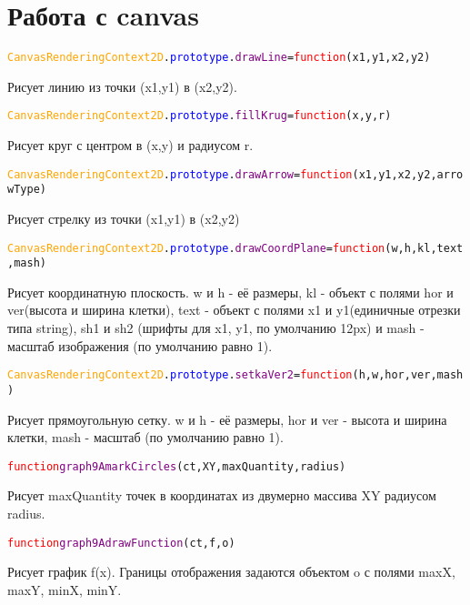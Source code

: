 \documentclass[a4paper,12pt]{article}
\begin{document}
	\section{Работа с canvas}
	\begin{alltt}
		\textcolor{Orange}{CanvasRenderingContext2D}.\textcolor{Blue}{prototype}.\textcolor{Purple}{drawLine}=\textcolor{Red}{function}(x1,y1,x2,y2)
	\end{alltt}
	Рисует линию из точки (x1,y1) в (x2,y2).
	\begin{alltt}
		\textcolor{Orange}{CanvasRenderingContext2D}.\textcolor{Blue}{prototype}.\textcolor{Purple}{fillKrug}=\textcolor{Red}{function}(x,y,r)
	\end{alltt}
	Рисует круг с центром в (x,y) и радиусом r. 
		\begin{alltt}
		\textcolor{Orange}{CanvasRenderingContext2D}.\textcolor{Blue}{prototype}.\textcolor{Purple}{drawArrow}=\textcolor{Red}{function}(x1, y1, x2, y2, arrowType)
	\end{alltt}%
	Рисует стрелку из точки (x1,y1) в (x2,y2)
	\begin{alltt}
		\textcolor{Orange}{CanvasRenderingContext2D}.\textcolor{Blue}{prototype}.\textcolor{Purple}{drawCoordPlane }=\textcolor{Red}{function}(w, h, kl, text, mash)
	\end{alltt}
	Рисует координатную плоскость. w и h  \-- её размеры, kl \-- объект с полями hor и ver(высота и ширина клетки), text \-- объект с полями x1 и y1(единичные отрезки типа string), sh1 и sh2 (шрифты для x1, y1, по умолчанию 12px) и mash - масштаб изображения (по умолчанию равно 1).
	\begin{alltt}
		\textcolor{Orange}{CanvasRenderingContext2D}.\textcolor{Blue}{prototype}.\textcolor{Purple}{setkaVer2  }=\textcolor{Red}{function}(h, w, hor, ver, mash)
	\end{alltt}
	Рисует прямоугольную сетку. w и h  \-- её размеры, hor и ver \-- высота и ширина клетки, mash - масштаб (по умолчанию равно 1).
	\begin{alltt} 	\textcolor{Red}{function} \textcolor{Purple}{graph9AmarkCircles}(ct, XY, maxQuantity, radius)
	\end{alltt}	
	Рисует maxQuantity точек в координатах из двумерно массива XY радиусом radius.
	\begin{alltt} 	\textcolor{Red}{function} \textcolor{Purple}{graph9AdrawFunction}(ct, f, o)
	\end{alltt}	
	Рисует график f(x). Границы отображения задаются объектом o с полями maxX, maxY, minX, minY.
\end{document}
